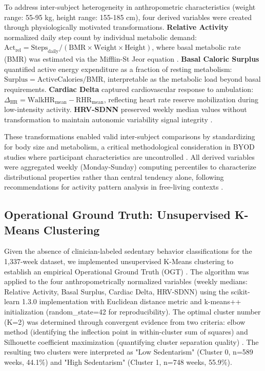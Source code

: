 To address inter-subject heterogeneity in anthropometric characteristics (weight range: 55-95 kg, height range: 155-185 cm), four derived variables were created through physiologically motivated transformations. \textbf{Relative Activity} normalized daily step count by individual metabolic demand: $\text{Act}_{\text{rel}} = \text{Steps}_{\text{daily}} / (\text{BMR} \times \text{Weight} \times \text{Height})$, where basal metabolic rate (BMR) was estimated via the Mifflin-St Jeor equation \cite{Mifflin1990}. \textbf{Basal Caloric Surplus} quantified active energy expenditure as a fraction of resting metabolism: $\text{Surplus} = \text{ActiveCalories} / \text{BMR}$, interpretable as the metabolic load beyond basal requirements. \textbf{Cardiac Delta} captured cardiovascular response to ambulation: $\Delta_{\text{HR}} = \text{WalkHR}_{\text{mean}} - \text{RHR}_{\text{mean}}$, reflecting heart rate reserve mobilization during low-intensity activity. \textbf{HRV-SDNN} preserved weekly median values without transformation to maintain autonomic variability signal integrity \cite{Shaffer2017}.

These transformations enabled valid inter-subject comparisons by standardizing for body size and metabolism, a critical methodological consideration in BYOD studies where participant characteristics are uncontrolled \cite{Guyon2003}. All derived variables were aggregated weekly (Monday-Sunday) computing percentiles to characterize distributional properties rather than central tendency alone, following recommendations for activity pattern analysis in free-living contexts \cite{Dumuid2018}.

\subsection{Operational Ground Truth: Unsupervised K-Means Clustering}
\label{subsec:clustering}

Given the absence of clinician-labeled sedentary behavior classifications for the 1,337-week dataset, we implemented unsupervised K-Means clustering to establish an empirical Operational Ground Truth (OGT) \cite{Jain2010}. The algorithm was applied to the four anthropometrically normalized variables (weekly medians: Relative Activity, Basal Surplus, Cardiac Delta, HRV-SDNN) using the scikit-learn 1.3.0 implementation with Euclidean distance metric and k-means++ initialization (random\_state=42 for reproducibility). The optimal cluster number (K=2) was determined through convergent evidence from two criteria: elbow method (identifying the inflection point in within-cluster sum of squares) and Silhouette coefficient maximization (quantifying cluster separation quality) \cite{Rousseeuw1987}. The resulting two clusters were interpreted as "Low Sedentarism" (Cluster 0, n=589 weeks, 44.1\%) and "High Sedentarism" (Cluster 1, n=748 weeks, 55.9\%).

